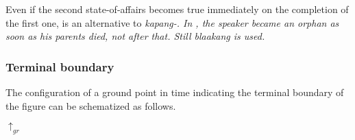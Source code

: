 

%
%

Even if the second state-of-affairs becomes true immediately on the completion of the first one,  is an alternative to \em kapang-\em. In , the speaker became an orphan as soon as his parents died, not after that. Still \em blaakang \em is used.



\subsubsection{Terminal boundary}\label{sec:func:Terminalboundary}

The configuration of a ground point in time indicating the terminal boundary of the figure can be schematized as follows.

\parbox{8cm}{
\z
 {\Large\vspace{-0.5cm}\hspace{1.5cm} $\uparrow_{gr} $}
}


